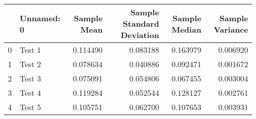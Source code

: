 \begin{tabular}{llrrrr}
\toprule
{} & Unnamed: 0 &  Sample Mean &  Sample Standard Deviation &  Sample Median &  Sample Variance \\
\midrule
0 &     Test 1 &     0.114490 &                   0.083188 &       0.163979 &         0.006920 \\
1 &     Test 2 &     0.078634 &                   0.040886 &       0.092471 &         0.001672 \\
2 &     Test 3 &     0.075091 &                   0.054806 &       0.067455 &         0.003004 \\
3 &     Test 4 &     0.119284 &                   0.052544 &       0.128127 &         0.002761 \\
4 &     Test 5 &     0.105751 &                   0.062700 &       0.107653 &         0.003931 \\
\bottomrule
\end{tabular}

